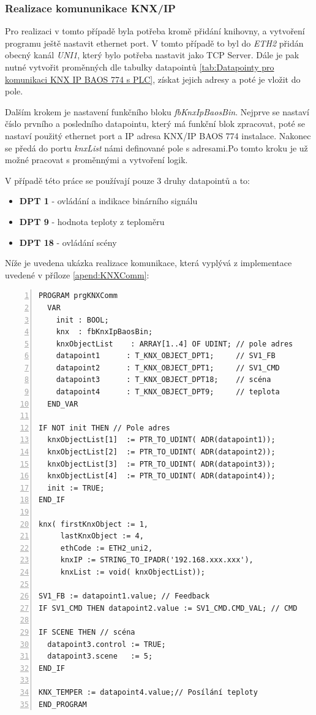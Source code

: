 \subsubsection{Realizace komununikace KNX/IP}
Pro realizaci v tomto případě byla potřeba kromě přidání knihovny, a vytvoření programu ještě nastavit ethernet port. V tomto případě to byl do \textit{ETH2} přidán obecný kanál \textit{UNI1}, který bylo potřeba nastavit jako TCP Server. Dále je pak nutné vytvořit proměnných dle tabulky datapointů \ref{tab:Datapointy pro komunikaci KNX IP BAOS 774 s PLC}, získat jejich adresy a poté je vložit do pole.

Dalším krokem je nastavení funkčního bloku \textit{fbKnxIpBaosBin}. Nejprve se nastaví číslo prvního a posledního datapointu, který má funkční blok zpracovat, poté se nastaví použitý ethernet port a IP adresa KNX/IP BAOS 774 instalace. Nakonec se předá do portu \textit{knxList} námi definované pole s adresami.Po tomto kroku je už možné pracovat s proměnnými a vytvoření logik.

V případě této práce se používají pouze 3 druhy datapointů a to:
\begin{itemize}
    \item \textbf{DPT 1} - ovládání a indikace binárního signálu
    \item \textbf{DPT 9} - hodnota teploty z teploměru
    \item \textbf{DPT 18} - ovládání scény \newline
\end{itemize}
Níže je uvedena ukázka realizace komunikace, která vyplývá z implementace uvedené v příloze \ref{apend:KNXComm}:
\begin{lstlisting}[language=ST, breaklines=true, numbers=left, numberstyle=\small, numbersep=10pt, frame=single, basicstyle=\ttfamily\small, caption={Implementace komunikace KNX/IP}, label={lst:komunikace_knx}]
PROGRAM prgKNXComm
  VAR
    init : BOOL;
    knx  : fbKnxIpBaosBin;
    knxObjectList    : ARRAY[1..4] OF UDINT; // pole adres
    datapoint1      : T_KNX_OBJECT_DPT1;     // SV1_FB
    datapoint2      : T_KNX_OBJECT_DPT1;     // SV1_CMD
    datapoint3      : T_KNX_OBJECT_DPT18;    // scéna
    datapoint4      : T_KNX_OBJECT_DPT9;     // teplota
  END_VAR

IF NOT init THEN // Pole adres
  knxObjectList[1]  := PTR_TO_UDINT( ADR(datapoint1));
  knxObjectList[2]  := PTR_TO_UDINT( ADR(datapoint2));
  knxObjectList[3]  := PTR_TO_UDINT( ADR(datapoint3));
  knxObjectList[4]  := PTR_TO_UDINT( ADR(datapoint4));
  init := TRUE;
END_IF

knx( firstKnxObject := 1,
     lastKnxObject := 4,
     ethCode := ETH2_uni2,
     knxIP := STRING_TO_IPADR('192.168.xxx.xxx'),
     knxList := void( knxObjectList));

SV1_FB := datapoint1.value; // Feedback
IF SV1_CMD THEN datapoint2.value := SV1_CMD.CMD_VAL; // CMD

IF SCENE THEN // scéna
  datapoint3.control := TRUE;
  datapoint3.scene   := 5;
END_IF

KNX_TEMPER := datapoint4.value;// Posílání teploty
END_PROGRAM
\end{lstlisting}
